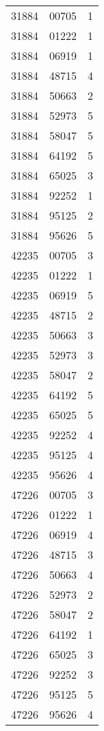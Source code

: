 {{\begin{tabular}{|c|c|c|}
31884&00705&1\\ 31884&01222&1\\ 31884&06919&1\\ 31884&48715&4\\ 31884&50663&2\\ 31884&52973&5\\ 31884&58047&5\\ 31884&64192&5\\ 31884&65025&3\\ 31884&92252&1\\ 31884&95125&2\\ 31884&95626&5\\ 42235&00705&3\\ 42235&01222&1\\ 42235&06919&5\\ 42235&48715&2\\ 42235&50663&3\\ 42235&52973&3\\ 42235&58047&2\\ 42235&64192&5\\ 42235&65025&5\\ 42235&92252&4\\ 42235&95125&4\\ 42235&95626&4\\ 47226&00705&3\\ 47226&01222&1\\ 47226&06919&4\\ 47226&48715&3\\ 47226&50663&4\\ 47226&52973&2\\ 47226&58047&2\\ 47226&64192&1\\ 47226&65025&3\\ 47226&92252&3\\ 47226&95125&5\\ 47226&95626&4\\ 
		\hline
		\end{tabular}
	}
}


